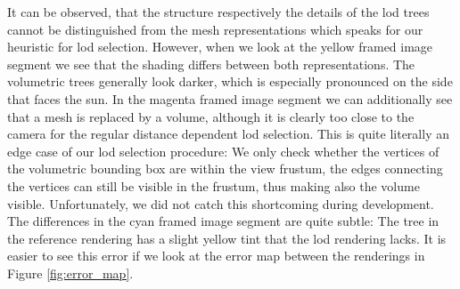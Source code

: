 It can be observed, that the structure respectively the details of the \acs{lod} trees cannot be distinguished from the mesh representations which speaks for our heuristic for \ac{lod} selection.
However, when we look at the yellow framed image segment we see that the shading differs between both representations.
The volumetric trees generally look darker, which is especially pronounced on the side that faces the sun.
In the magenta framed image segment we can additionally see that a mesh is replaced by a volume, although it is clearly too close to the camera for the regular distance dependent \ac{lod} selection.
This is quite literally an edge case of our \ac{lod} selection procedure: We only check whether the vertices of the volumetric bounding box are within the view frustum, the edges connecting the vertices can still be visible in the frustum, thus making also the volume visible.
Unfortunately, we did not catch this shortcoming during development.
The differences in the cyan framed image segment are quite subtle: The tree in the reference rendering has a slight yellow tint that the \ac{lod} rendering lacks.
It is easier to see this error if we look at the \FLIP error map between the renderings in Figure \ref{fig:error_map}.
